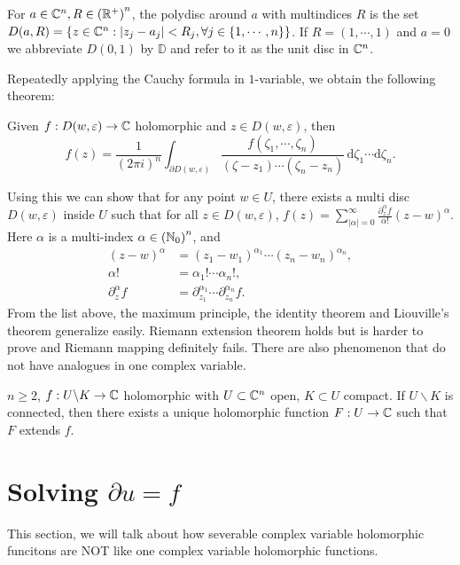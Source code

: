 \begin{definition}
  For $a\in \mathbb{C}^{n}, R\in \left( \mathbb{R}^{+} \right) ^{n}$, the polydisc around $a$ with multindices $R$ is the set $D(a,R)=\left\{z\in \mathbb{C}^{n}:|z_j-a_j|<R_j,\forall j\in \left\{1,\cdots ,n\right\} \right\} $. If $R=(1,\cdots ,1)$ and $a=0$ we abbreviate $D(0,1)$ by $\mathbb{D}$ and refer to it as the unit disc in $\mathbb{C}^{n}$. 
\end{definition}
Repeatedly applying the Cauchy formula in $1$-variable, we obtain the following theorem:
\begin{theorem}
 Given $f:D(w,\varepsilon )\to \mathbb{C}$ holomorphic and $z\in D(w,\varepsilon )$, then 
  \[
    f(z)=\frac{1}{\left( 2\pi i \right) ^{n}}\int_{\partial D(w,\varepsilon )}\frac{f(\zeta_1,\cdots ,\zeta_n)}{(\zeta-z_1)\cdots (\zeta_n-z_n)}\,\mathrm{d}\zeta_1\cdots \mathrm{d}\zeta_n.
  \] 
\end{theorem}
Using this we can show that for any point $w\in U$, there exists a multi disc $D(w,\varepsilon )$ inside $U$ such that for all $z\in D(w,\varepsilon )$, $f(z)=\sum_{|\alpha|=0}^{\infty} \frac{\partial^{\alpha}_z f}{\alpha!}(z-w)^{\alpha}$. Here $\alpha$ is a multi-index $\alpha \in \left( \mathbb{N}_0 \right) ^{n}$, and 
\begin{align*}{}
  (z-w)^{\alpha}&= (z_1-w_1)^{\alpha_1}\cdots (z_n-w_n)^{\alpha_n}, \\
  \alpha! &= \alpha_1!\cdots \alpha_n!, \\
  \partial^{\alpha}_{z}f&=\partial_{z_1}^{\alpha_1}\cdots \partial_{z_n}^{\alpha_n}f
.\end{align*}
From the list above, the maximum principle, the identity theorem and Liouville's theorem generalize easily.
Riemann extension theorem holds but is harder to prove and Riemann mapping definitely fails. There are also phenomenon that do not have analogues in one complex variable. 
\begin{theorem}
  $n\ge 2$, $f:U \backslash  K\to \mathbb{C}$ holomorphic with $U \subset  \mathbb{C}^{n}$ open, $K\subset U$ compact. If $U \backslash  K$ is connected, then there exists a unique holomorphic function $F:U\to \mathbb{C}$ such that $F$ extends $f$.
\end{theorem}

\section{Solving $\partial u = f$}
This section, we will talk about how severable complex variable holomorphic funcitons are NOT like one complex variable holomorphic functions.

